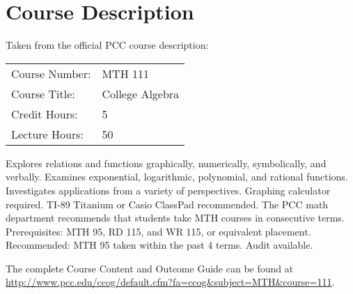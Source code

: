 \documentclass[10pt,]{article}
\theoremstyle{plain}
\begin{document}
\section[Course Description]{Course Description}\label{section-course-description}
Taken from the official PCC course description:%
\leavevmode%
\begin{table}
\centering
\begin{tabular}{ll}
Course Number:&MTH 111\\
Course Title:&College Algebra\\
Credit Hours:&5\\
Lecture Hours:&50
\end{tabular}
\end{table}
\par
Explores relations and functions graphically, numerically, symbolically, and verbally. Examines exponential, logarithmic, polynomial, and rational functions. Investigates applications from a variety of perspectives. Graphing calculator required. TI-89 Titanium or Casio ClassPad recommended. The PCC math department recommends that students take MTH courses in consecutive terms. Prerequisites: MTH 95, RD 115, and WR 115, or equivalent placement. Recommended: MTH 95 taken within the past 4 terms. Audit available.%
\par
The complete Course Content and Outcome Guide can be found at \url{http://www.pcc.edu/ccog/default.cfm?fa=ccog&subject=MTH&course=111}.%
\end{document}
